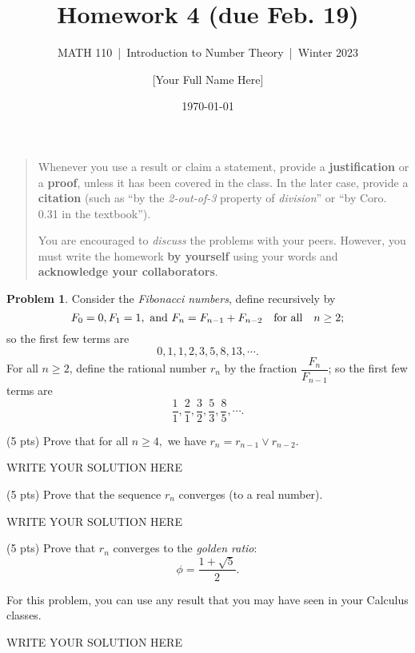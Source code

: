 \documentclass[11pt]{article}
\title{Homework 4 (due Feb. 19)}
\author{[Your Full Name Here]}
\subtitle{MATH 110~|~Introduction to Number Theory~|~Winter 2023}
\date{\today}
\theoremstyle{plain}
\theoremstyle{definition}
\newtheorem{problem}{Problem}
\theoremstyle{remark}
\numberwithin{equation}{problem}
\begin{document}
\maketitle

\begin{quotation}
Whenever you use a result or claim a statement, provide a \textbf{justification} or a \textbf{proof}, unless it has been covered in the class. In the later case, provide a \textbf{citation} (such as ``by the \emph{2-out-of-3} property of \emph{division}'' or ``by Coro. 0.31 in the textbook'').

You are encouraged to \emph{discuss} the problems with your peers. However, you must write the homework \textbf{by yourself} using your words and \textbf{acknowledge your collaborators}.
\end{quotation}

\begin{problem}
	Consider the \emph{Fibonacci numbers}, define recursively by
	\[
		F_0 = 0, F_1 = 1, \text{ and } F_n = F_{n-1} + F_{n-2} \quad\text{for all}\quad 
		n\geq 2;
	\]
	so the first few terms are 
	\[
		0,1,1,2,3,5,8,13,\cdots.
	\]
	For all $n\geq 2$, define the rational number $r_n$ by the fraction $\dfrac{F_n}{F_{n-1}}$; so the first few terms are
	\[
		\frac{1}{1}, \frac{2}{1}, \frac{3}{2}, \frac{5}{3}, \frac{8}{5}, \cdots.
	\]
	\begin{listinprob}
	\item (5 pts) Prove that for all $n\geq 4,$ we have $r_n = r_{n-1} \vee r_{n-2}$.
\begin{solution} %
WRITE YOUR SOLUTION HERE
\end{solution}\clearpage %

	\item (5 pts) Prove that the sequence $r_n$ converges (to a real number).
\begin{solution} %
WRITE YOUR SOLUTION HERE
\end{solution}\clearpage %

	\item (5 pts) Prove that $r_n$ converges to the \emph{golden ratio}:
	\[
		\phi = \frac{1 + \sqrt{5}}{2}.
	\]
	\end{listinprob}
	For this problem, you can use any result that you may have seen in your Calculus classes.
\end{problem}
\begin{solution} %
WRITE YOUR SOLUTION HERE
\end{solution}\clearpage %
\end{document}
